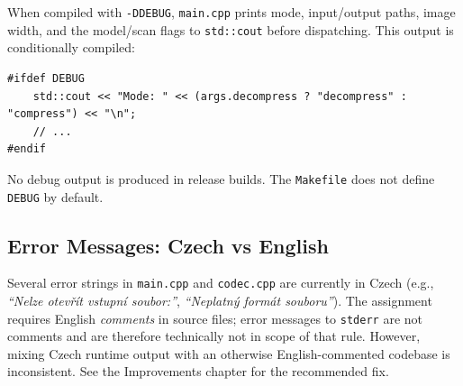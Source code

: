 When compiled with \texttt{-DDEBUG}, \texttt{main.cpp} prints mode, input/output paths,
image width, and the model/scan flags to \texttt{std::cout} before dispatching.
This output is conditionally compiled:

\begin{lstlisting}[style=cpp]
#ifdef DEBUG
    std::cout << "Mode: " << (args.decompress ? "decompress" : "compress") << "\n";
    // ...
#endif
\end{lstlisting}

No debug output is produced in release builds.
The \texttt{Makefile} does not define \texttt{DEBUG} by default.

\subsection{Error Messages: Czech vs English}

Several error strings in \texttt{main.cpp} and \texttt{codec.cpp} are currently in Czech
(e.g., \textit{``Nelze otevřít vstupní soubor:''}, \textit{``Neplatný formát souboru''}).
The assignment requires English \emph{comments} in source files; error messages to
\texttt{stderr} are not comments and are therefore technically not in scope of that rule.
However, mixing Czech runtime output with an otherwise English-commented codebase is
inconsistent.
See the Improvements chapter for the recommended fix.
